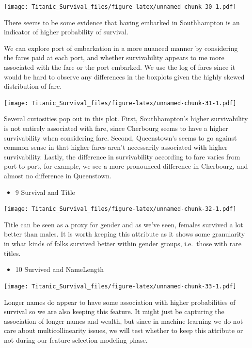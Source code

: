 \documentclass[]{article}
\providecommand{\tightlist}{%
  \setlength{\itemsep}{0pt}\setlength{\parskip}{0pt}}
\begin{document}
\texttt{[image: Titanic\_Survival\_files/figure-latex/unnamed-chunk-30-1.pdf]}

There seems to be some evidence that having embarked in Southhampton is
an indicator of higher probability of survival.

We can explore port of embarkation in a more nuanced manner by
considering the fares paid at each port, and whether survivability
appears to me more associated with the fare or the port embarked. We use
the log of fares since it would be hard to observe any differences in
the boxplots given the highly skewed distribution of fare.

\texttt{[image: Titanic\_Survival\_files/figure-latex/unnamed-chunk-31-1.pdf]}

Several curiosities pop out in this plot. First, Southhampton's higher
survivability is not entirely associated with fare, since Cherbourg
seems to have a higher survivability when considering fare. Second,
Queenstown's seems to go against common sense in that higher fares
aren't necessarily associated with higher survivability. Lastly, the
difference in survivability according to fare varies from port to port,
for example, we see a more pronounced difference in Cherbourg, and
almost no difference in Queenstown.

\begin{itemize}
\tightlist
\item
  9 Survival and Title
\end{itemize}

\texttt{[image: Titanic\_Survival\_files/figure-latex/unnamed-chunk-32-1.pdf]}

Title can be seen as a proxy for gender and as we've seen, females
survived a lot better than males. It is worth keeping this attribute as
it shows some granularity in what kinds of folks survived better within
gender groups, i.e.~those with rare titles.

\begin{itemize}
\tightlist
\item
  10 Survived and NameLength
\end{itemize}

\texttt{[image: Titanic\_Survival\_files/figure-latex/unnamed-chunk-33-1.pdf]}

Longer names do appear to have some association with higher
probabilities of survival so we are also keeping this feature. It might
just be capturing the association of longer names and wealth, but since
in machine learning we do not care about multicollinearity issues, we
will test whether to keep this attribute or not during our feature
selection modeling phase.
\end{document}
